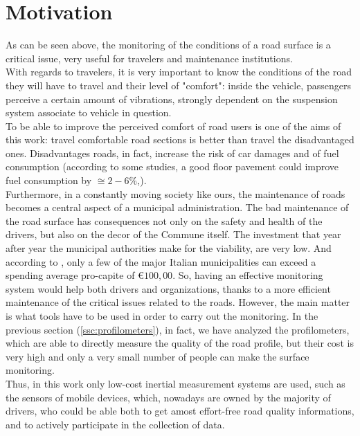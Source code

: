 \documentclass[tesi]{subfiles}
\begin{document}
\clearpage
	\section{Motivation}\label{sc:Motivation}
\noindent
As can be seen above, the monitoring of the conditions of a road surface is a critical issue, very useful for travelers and maintenance institutions.\\
With regards to travelers, it is very important to know the conditions of the road they will have to travel and their level of "comfort": inside the vehicle, passengers perceive a certain amount of vibrations, strongly dependent on the suspension system associate to vehicle in question.\\
To be able to improve the perceived comfort of road users is one of the aims of this work: travel comfortable road sections is better than travel the disadvantaged ones. Disadvantages roads, in fact, increase the risk of car damages and of fuel consumption (according to some studies, a good floor pavement could improve fuel consumption by $\displaystyle{\cong{2-6\%}}$\cite{jackson2011synthesis},\cite{jointeapa}).\\
Furthermore, in a constantly moving society like ours, the maintenance of roads becomes a central aspect of a municipal administration. The bad maintenance of the road surface has consequences not only on the safety and health of the drivers, but also on the decor of the Commune itself. 
The investment that year after year the municipal authorities make for the viability, are very low. And according to \cite{piemonte2013finanza}, only a few of the major Italian municipalities can exceed a spending average pro-capite of $\displaystyle{\euro 100,00}$.
So, having an effective monitoring system would help both drivers and organizations, thanks to a more efficient maintenance of the critical issues related to the roads.
However, the main matter is what tools have to be used in order to carry out the monitoring. In the previous section (\ref{ssc:profilometers}), in fact, we have analyzed the profilometers, which are able to directly measure the quality of the road profile, but their cost is very high and only a very small number of people can make the surface monitoring. \\Thus, in this work only low-cost inertial measurement systems are used, such as the sensors of mobile devices, which, nowadays are owned by the majority of drivers, who could be able both to get amost effort-free road quality informations, and to actively participate in the collection of data.
\end{document}
